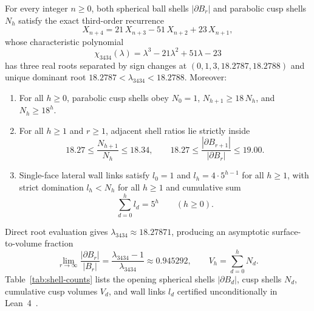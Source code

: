 \begin{theorem}
\label{thm:cubic-growth}
For every integer $n \ge 0$, both spherical ball shells $|\partial B_r|$ and parabolic cusp shells $N_h$ satisfy the exact third-order recurrence
\begin{equation}
\label{eq:cubic-rec}
X_{n+4} = 21\,X_{n+3} - 51\,X_{n+2} + 23\,X_{n+1},
\end{equation}
whose characteristic polynomial
\begin{equation}
\label{eq:char-poly}
\chi_{3434}(\lambda) = \lambda^3 - 21\lambda^2 + 51\lambda - 23
\end{equation}
has three real roots separated by sign changes at $(0, 1, 3, 18.2787, 18.2788)$ and unique dominant root $18.2787 < \lambda_{3434} < 18.2788$. Moreover:
\begin{enumerate}
\item For all $h \ge 0$, parabolic cusp shells obey $N_0 = 1$, $N_{h+1} \ge 18\,N_h$, and $N_h \ge 18^h$.
\item For all $h \ge 1$ and $r \ge 1$, adjacent shell ratios lie strictly inside
\begin{equation}
\label{eq:ratio-brackets}
18.27 \le \frac{N_{h+1}}{N_h} \le 18.34, \qquad 18.27 \le \frac{|\partial B_{r+1}|}{|\partial B_r|} \le 19.00.
\end{equation}
\item Single-face lateral wall links satisfy $l_0 = 1$ and $l_h = 4 \cdot 5^{h-1}$ for all $h \ge 1$, with strict domination $l_h < N_h$ for all $h \ge 1$ and cumulative sum
\begin{equation}
\label{eq:wall-sum}
\sum_{d=0}^{h} l_d = 5^h \qquad (h \ge 0).
\end{equation}
\end{enumerate}
\end{theorem}

Direct root evaluation gives $\lambda_{3434} \approx 18.27871$, producing an asymptotic surface-to-volume fraction
\begin{equation}
\label{eq:surface-vol}
\lim_{r \to \infty} \frac{|\partial B_r|}{|B_r|} = \frac{\lambda_{3434} - 1}{\lambda_{3434}} \approx 0.945292, \qquad V_h = \sum_{d=0}^{h} N_d.
\end{equation}
Table~\ref{tab:shell-counts} lists the opening spherical shells $|\partial B_d|$, cusp shells $N_d$, cumulative cusp volumes $V_d$, and wall links $l_d$ certified unconditionally in Lean~4~\cite{pollard2026repo}.

